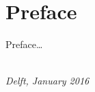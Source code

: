 \chapter*{Preface}

Preface\ldots

\begin{flushright}
{\makeatletter\itshape
    \@author \\
    Delft, January 2016
\makeatother}
\end{flushright}

